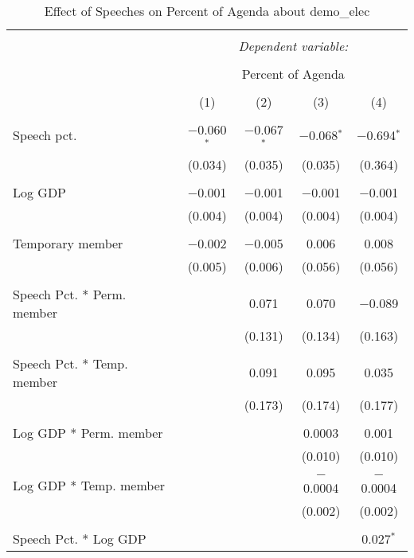 
\begin{table}[!htbp] \centering 
  \caption{Effect of Speeches on Percent of Agenda about  demo_elec} 
  \label{} 
\begin{tabular}{@{\extracolsep{5pt}}lcccc} 
\\[-1.8ex]\hline 
\hline \\[-1.8ex] 
 & \multicolumn{4}{c}{\textit{Dependent variable:}} \\ 
\cline{2-5} 
\\[-1.8ex] & \multicolumn{4}{c}{Percent of Agenda} \\ 
\\[-1.8ex] & (1) & (2) & (3) & (4)\\ 
\hline \\[-1.8ex] 
 Speech pct. & $-$0.060$^{*}$ & $-$0.067$^{*}$ & $-$0.068$^{*}$ & $-$0.694$^{*}$ \\ 
  & (0.034) & (0.035) & (0.035) & (0.364) \\ 
  & & & & \\ 
 Log GDP & $-$0.001 & $-$0.001 & $-$0.001 & $-$0.001 \\ 
  & (0.004) & (0.004) & (0.004) & (0.004) \\ 
  & & & & \\ 
 Temporary member & $-$0.002 & $-$0.005 & 0.006 & 0.008 \\ 
  & (0.005) & (0.006) & (0.056) & (0.056) \\ 
  & & & & \\ 
 Speech Pct. * Perm. member &  & 0.071 & 0.070 & $-$0.089 \\ 
  &  & (0.131) & (0.134) & (0.163) \\ 
  & & & & \\ 
 Speech Pct. * Temp. member &  & 0.091 & 0.095 & 0.035 \\ 
  &  & (0.173) & (0.174) & (0.177) \\ 
  & & & & \\ 
 Log GDP * Perm. member &  &  & 0.0003 & 0.001 \\ 
  &  &  & (0.010) & (0.010) \\ 
  & & & & \\ 
 Log GDP * Temp. member &  &  & $-$0.0004 & $-$0.0004 \\ 
  &  &  & (0.002) & (0.002) \\ 
  & & & & \\ 
 Speech Pct. * Log GDP &  &  &  & 0.027$^{*}$ \\ 

\end{tabular}
\end{table}
